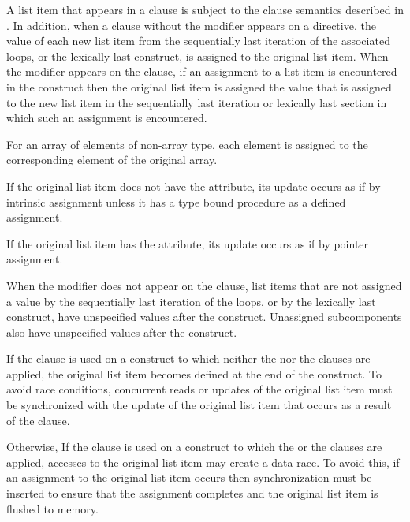 A list item that appears in a  clause is subject to the  clause
semantics described in
.
In addition, when a
 clause without the  modifier appears on a directive,
the value of each new list item from the sequentially last iteration
of the associated loops, or the lexically last  construct, is assigned to the
original list item. When the  modifier appears on the clause,
if an assignment to a list item is encountered in the construct then the
original list item is assigned the value that is assigned to the new list item
in the sequentially last iteration or lexically last section in which such an
assignment is encountered.


\begin{ccppspecific}
For an array of elements of non-array type, each element is assigned to the
corresponding element of the original array.
\end{ccppspecific}
%
\begin{fortranspecific}
If the original list item does not have the  attribute,
its update occurs as if by intrinsic assignment unless it has a type
bound procedure as a defined assignment.

If the original list item has the  attribute, its update occurs as if by pointer
assignment.
\end{fortranspecific}

When the  modifier does not appear on the  clause, list items that are not
assigned a value by the sequentially last iteration of the loops, or by the
lexically last  construct, have unspecified values after the
construct.  Unassigned subcomponents also have unspecified values after the
construct.

If the  clause is used on a construct to which neither
the  nor the  clauses are applied, the original list item
becomes defined at the end of the construct.  To avoid race conditions,
concurrent reads or updates of the original list item must be synchronized with
the update of the original list item that occurs as a result of the
 clause.

Otherwise, If the  clause is used on a construct to which
the  or the  clauses are applied, accesses to the original
list item may create a data race.  To avoid this, if an assignment to the
original list item occurs then synchronization must be inserted to ensure that
the assignment completes and the original list item is flushed to memory.


